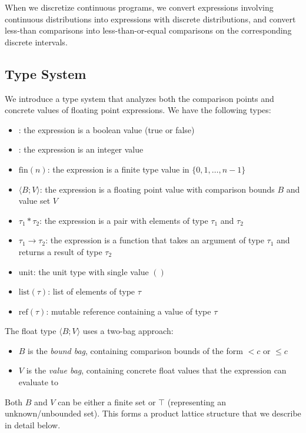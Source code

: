 When we discretize continuous programs, we convert expressions involving continuous distributions into expressions with discrete distributions, and convert less-than comparisons into less-than-or-equal comparisons on the corresponding discrete intervals.

\subsection{Type System}\label{sec:type-system}

We introduce a type system that analyzes both the comparison points and concrete values of floating point expressions. We have the following types:
\begin{itemize}
    \item \bool: the expression is a boolean value (true or false)
    \item \intty: the expression is an integer value  
    \item $\text{fin}(n)$: the expression is a finite type value in $\{0, 1, \ldots, n-1\}$
    \item \float$\langle B; V \rangle$: the expression is a floating point value with comparison bounds $B$ and value set $V$
    \item $\tau_1 * \tau_2$: the expression is a pair with elements of type $\tau_1$ and $\tau_2$
    \item $\tau_1 \rightarrow \tau_2$: the expression is a function that takes an argument of type $\tau_1$ and returns a result of type $\tau_2$
    \item $\text{unit}$: the unit type with single value $()$
    \item $\text{list}(\tau)$: list of elements of type $\tau$
    \item $\text{ref}(\tau)$: mutable reference containing a value of type $\tau$
\end{itemize}

The float type \float$\langle B; V \rangle$ uses a two-bag approach:
\begin{itemize}
    \item $B$ is the \emph{bound bag}, containing comparison bounds of the form $< c$ or $\leq c$
    \item $V$ is the \emph{value bag}, containing concrete float values that the expression can evaluate to
\end{itemize}

Both $B$ and $V$ can be either a finite set or $\top$ (representing an unknown/unbounded set). This forms a product lattice structure that we describe in detail below.

